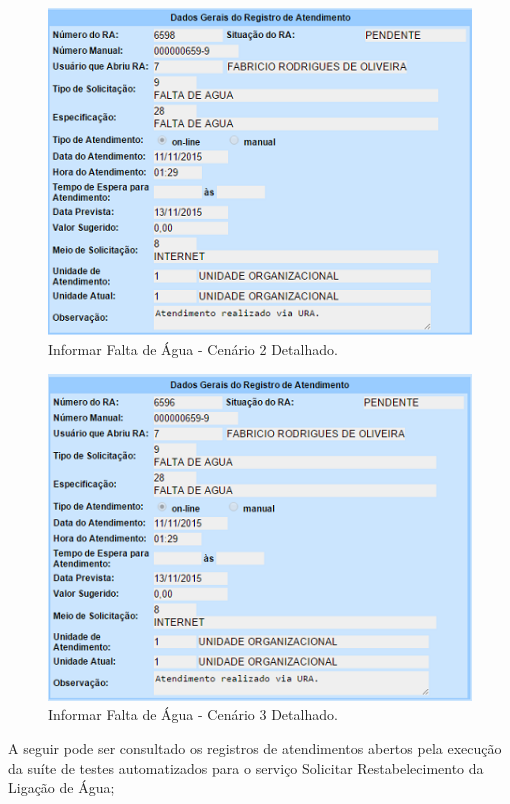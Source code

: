 \begin{anexosenv}
\begin{figure}[H]
	\centering
	\caption{Informar Falta de Água - Cenário 2 Detalhado.}
	\includegraphics{figuras/anexo/falta_agua/detalhe_2.png}
\end{figure}

\begin{figure}[H]
	\centering
	\caption{Informar Falta de Água - Cenário 3 Detalhado.}
	\includegraphics{figuras/anexo/falta_agua/detalhe_3.png}
\end{figure}


A seguir pode ser consultado os registros de atendimentos abertos pela execução da suíte de testes automatizados para o serviço Solicitar Restabelecimento da Ligação de Água;


\end{anexosenv}
